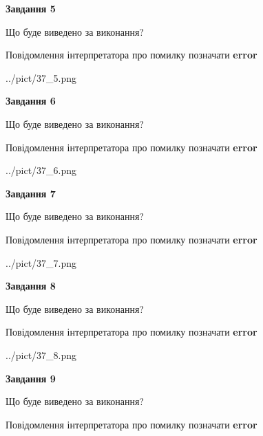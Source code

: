 \documentclass[11pt, ukrainian]{article}
\begin{document}
{\begin {large}
{\begin {center}\textbf{Завдання 5}\end {center}}\par
Що буде виведено за виконання? \par
Повідомлення інтерпретатора про помилку позначати \textbf{error}

\begin{center}
	{../pict/37_5.png}
\end{center}
\newpage

{\begin {center}\textbf{Завдання 6}\end {center}}\par
Що буде виведено за виконання? \par
Повідомлення інтерпретатора про помилку позначати \textbf{error}

\begin{center}
	{../pict/37_6.png}
\end{center}
\newpage

{\begin {center}\textbf{Завдання 7}\end {center}}\par
Що буде виведено за виконання? \par
Повідомлення інтерпретатора про помилку позначати \textbf{error}

\begin{center}
	{../pict/37_7.png}
\end{center}
\newpage

{\begin {center}\textbf{Завдання 8}\end {center}}\par
Що буде виведено за виконання? \par
Повідомлення інтерпретатора про помилку позначати \textbf{error}

\begin{center}
	{../pict/37_8.png}
\end{center}
\newpage

{\begin {center}\textbf{Завдання 9}\end {center}}\par
Що буде виведено за виконання? \par
Повідомлення інтерпретатора про помилку позначати \textbf{error}


\end{large}}
\end{document}
